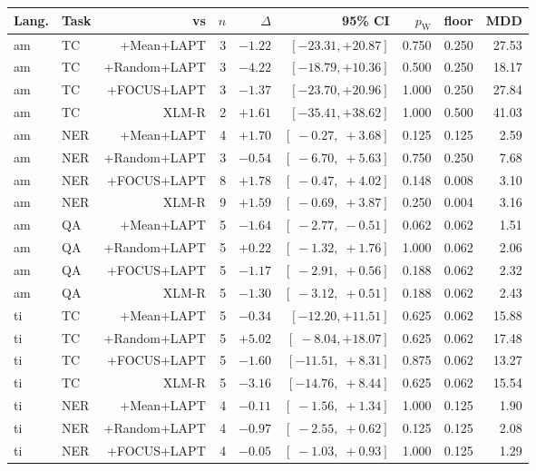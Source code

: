 \documentclass[11pt]{article}
\begin{document}
\begin{table}[t]
\centering
\small
\begin{tabular}{llrrrrrrr}
\toprule
Lang. & Task & vs & $n$ & $\Delta$ & 95\% CI & $p_{\text{W}}$ & floor & MDD \\
\midrule
am & TC  & +Mean+LAPT   & 3 & $-1.22$ & $[-23.31, +20.87]$ & 0.750 & 0.250 & 27.53 \\
am & TC  & +Random+LAPT & 3 & $-4.22$ & $[-18.79, +10.36]$ & 0.500 & 0.250 & 18.17 \\
am & TC  & +FOCUS+LAPT  & 3 & $-1.37$ & $[-23.70, +20.96]$ & 1.000 & 0.250 & 27.84 \\
am & TC  & XLM-R        & 2 & $+1.61$ & $[-35.41, +38.62]$ & 1.000 & 0.500 & 41.03 \\
\midrule
am & NER & +Mean+LAPT   & 4 & $+1.70$ & $[\;-0.27, \;+3.68]$ & 0.125 & 0.125 & 2.59 \\
am & NER & +Random+LAPT & 3 & $-0.54$ & $[\;-6.70, \;+5.63]$ & 0.750 & 0.250 & 7.68 \\
am & NER & +FOCUS+LAPT  & 8 & $+1.78$ & $[\;-0.47, \;+4.02]$ & 0.148 & 0.008 & 3.10 \\
am & NER & XLM-R        & 9 & $+1.59$ & $[\;-0.69, \;+3.87]$ & 0.250 & 0.004 & 3.16 \\
\midrule
am & QA  & +Mean+LAPT   & 5 & $-1.64$ & $[\;-2.77, \;-0.51]$ & 0.062 & 0.062 & 1.51 \\
am & QA  & +Random+LAPT & 5 & $+0.22$ & $[\;-1.32, \;+1.76]$ & 1.000 & 0.062 & 2.06 \\
am & QA  & +FOCUS+LAPT  & 5 & $-1.17$ & $[\;-2.91, \;+0.56]$ & 0.188 & 0.062 & 2.32 \\
am & QA  & XLM-R        & 5 & $-1.30$ & $[\;-3.12, \;+0.51]$ & 0.188 & 0.062 & 2.43 \\
\midrule
ti & TC  & +Mean+LAPT   & 5 & $-0.34$ & $[-12.20, +11.51]$ & 0.625 & 0.062 & 15.88 \\
ti & TC  & +Random+LAPT & 5 & $+5.02$ & $[\;-8.04, +18.07]$ & 0.625 & 0.062 & 17.48 \\
ti & TC  & +FOCUS+LAPT  & 5 & $-1.60$ & $[-11.51, \;+8.31]$ & 0.875 & 0.062 & 13.27 \\
ti & TC  & XLM-R        & 5 & $-3.16$ & $[-14.76, \;+8.44]$ & 0.625 & 0.062 & 15.54 \\
\midrule
ti & NER & +Mean+LAPT   & 4 & $-0.11$ & $[\;-1.56, \;+1.34]$ & 1.000 & 0.125 & 1.90 \\
ti & NER & +Random+LAPT & 4 & $-0.97$ & $[\;-2.55, \;+0.62]$ & 0.125 & 0.125 & 2.08 \\
ti & NER & +FOCUS+LAPT  & 4 & $-0.05$ & $[\;-1.03, \;+0.93]$ & 1.000 & 0.125 & 1.29 \\

\end{tabular}
\end{table}
\end{document}
